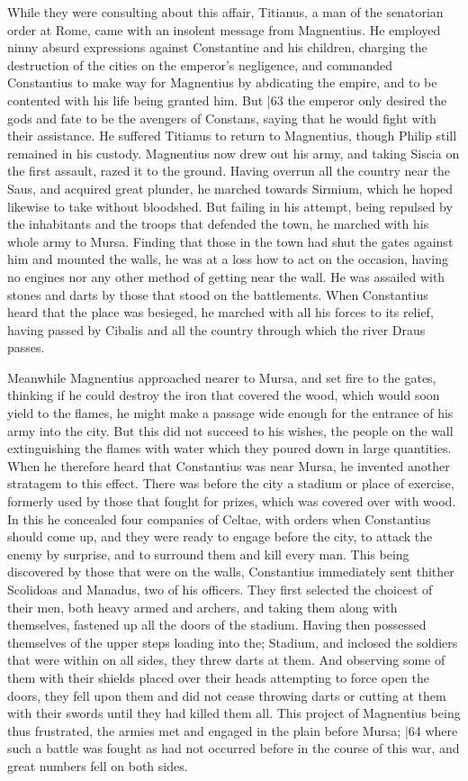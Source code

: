 While they were consulting about this affair, Titianus, a man of the senatorian order at Rome, came with an insolent message from Magnentius. He employed ninny absurd expressions against Constantine and his children, charging the destruction of the cities on the emperor's negligence, and commanded Constantius to make way for Magnentius by abdicating the empire, and to be contented with his life being granted him. But
|63 the emperor only desired the gods and fate to be the avengers of Constans, saying that he would fight with their assistance. He suffered Titianus to return to Magnentius, though Philip still remained in his custody. Magnentius now drew out his army, and taking Siscia on the first assault, razed it to the ground. Having overrun all the country near the Saus, and acquired great plunder, he marched towards Sirmium, which he hoped likewise to take without bloodshed. But failing in his attempt, being repulsed by the inhabitants and the troops that defended the town, he marched with his whole army to Mursa. Finding that those in the town had shut the gates against him and mounted the walls, he was at a loss how to act on the occasion, having no engines nor any other method of getting near the wall. He was assailed with stones and darts by those that stood on the battlements. When Constantius heard that the place was besieged, he marched with all his forces to its relief, having passed by Cibalis and all the country through which the river Draus passes.

Meanwhile Magnentius approached nearer to Mursa, and set fire to the gates, thinking if he could destroy the iron that covered the wood, which would soon yield to the flames, he might make a passage wide enough for the entrance of his army into the city. But this did not succeed to his wishes, the people on the wall extinguishing the flames with water which they poured down in large quantities. When he therefore heard that Constantius was near Mursa, he invented another stratagem to this effect. There was before the city a stadium or place of exercise, formerly used by those that fought for prizes, which was covered over with wood. In this he concealed four companies of Celtae, with orders when Constantius should come up, and they were ready to engage before the city, to attack the enemy by surprise, and to surround them and kill every man. This being discovered by those that were on the walls, Constantius immediately sent thither Scolidoas and Manadus, two of his officers. They first selected the choicest of their men, both heavy armed and archers, and taking them along with themselves, fastened up all the doors of the stadium. Having then possessed themselves of the upper steps loading into the; Stadium, and inclosed the soldiers that were within on all sides, they threw darts at them. And observing some of them with their shields placed over their heads attempting to force open the doors, they fell upon them and did not cease throwing darts or cutting at them with their swords until they had killed them all. This project of Magnentius being thus frustrated, the armies met and engaged in the plain before Mursa;
|64 where such a battle was fought as had not occurred before in the course of this war, and great numbers fell on both sides.

